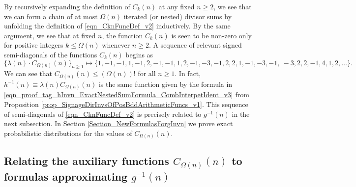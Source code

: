 \documentclass[11pt,reqno,a4letter]{article}
\numberwithin{figure}{section}
\numberwithin{table}{section}
\newcommand{\seqnum}[1]{\href{http://oeis.org/#1}{\color{ProcessBlue}{\underline{#1}}}}
\theoremstyle{plain}
\numberwithin{theorem}{section}
\theoremstyle{definition}
\begin{document}
By recursively expanding the definition of $C_k(n)$ 
at any fixed $n \geq 2$, we see that 
we can form a chain of at most $\Omega(n)$ iterated (or nested) divisor sums by 
unfolding the definition of \eqref{eqn_CknFuncDef_v2} inductively. 
By the same argument, we see that at fixed $n$, the function 
$C_k(n)$ is seen to be non-zero only for positive integers 
$k \leq \Omega(n)$ whenever $n \geq 2$. 
A sequence of relevant signed semi-diagonals of the functions $C_k(n)$ begins as 
\cite[\seqnum{A008480}]{OEIS} 
\[
\{\lambda(n) \cdot C_{\Omega(n)}(n) \}_{n \geq 1} \mapsto \{
     1, -1, -1, 1, -1, 2, -1, -1, 1, 2, -1, -3, -1, 2, 2, 1, -1, -3, -1, \
     -3, 2, 2, -1, 4, 1, 2, \ldots \}. 
\]
We can see that $C_{\Omega(n)}(n) \leq (\Omega(n))!$ for all $n \geq 1$. In fact, 
$h^{-1}(n) \equiv \lambda(n) C_{\Omega(n)}(n)$ is the same function given by 
the formula in \eqref{eqn_proof_tag_hInvn_ExactNestedSumFormula_CombInterpetIdent_v3} from 
Proposition \ref{prop_SignageDirInvsOfPosBddArithmeticFuncs_v1}. 
This sequence of semi-diagonals of 
\eqref{eqn_CknFuncDef_v2} 
is precisely related to $g^{-1}(n)$ in the next subsection. 
In Section \ref{Section_NewFormulasForgInvn} 
we prove exact probabilistic distributions for the values of 
$C_{\Omega(n)}(n)$. 

\subsection{Relating the auxiliary functions $C_{\Omega(n)}(n)$ to formulas approximating $g^{-1}(n)$} 
\label{subSection_Relating_CknFuncs_to_gInvn} 
\end{document}
